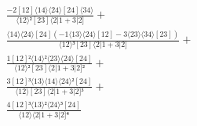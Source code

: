 \documentclass[varwidth, border=5pt]{standalone}
\begin{document}
\begin{my}
$\begin{gathered}
\scriptscriptstyle\frac{-2[12]⟨14⟩⟨24⟩[24]⟨34⟩}{⟨12⟩²[23]⟨2|1+3|2]} +\\
\scriptscriptstyle\frac{⟨14⟩⟨24⟩[24](-1⟨13⟩⟨24⟩[12]-3⟨23⟩⟨34⟩[23])}{⟨12⟩³[23]⟨2|1+3|2]} +\\
\scriptscriptstyle\frac{1[12]²⟨14⟩²⟨23⟩⟨24⟩[24]}{⟨12⟩²[23]⟨2|1+3|2]²} +\\
\scriptscriptstyle\frac{3[12]³⟨13⟩⟨14⟩⟨24⟩²[24]}{⟨12⟩[23]⟨2|1+3|2]³} +\\
\scriptscriptstyle\frac{4[12]³⟨13⟩²⟨24⟩³[24]}{⟨12⟩⟨2|1+3|2]⁴} \phantom{+}
\end{gathered}$
\end{my}
\end{document}

